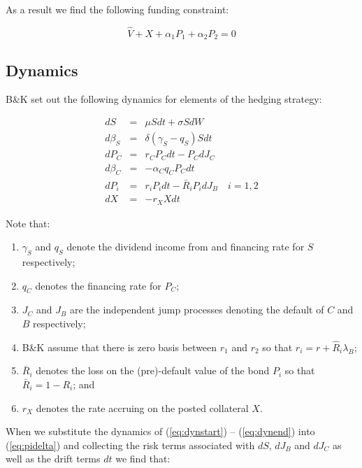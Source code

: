 \documentclass{tufte-handout}
\begin{document}
As a result we find the following funding constraint:

\begin{equation}\label{eq:fundingconstraint}
  \hat{V} + X + \alpha_1 P_1 + \alpha_2 P_2 = 0
\end{equation}

\subsection{Dynamics}\label{sec:dynamics}

B\&K set out the following dynamics for elements of the hedging strategy:

\begin{eqnarray}
  dS       & = & \mu S dt + \sigma S dW \label{eq:dynstart}\\
  d\beta_S & = & \delta (\gamma_S - q_S) S dt \\
  dP_C     & = & r_C P_C dt - P_C dJ_C \\
  d\beta_C & = &  -\alpha_C q_C P_C dt \\
  dP_i     & = & r_i P_i dt - \bar{R}_i P_i dJ_B \quad i = 1, 2\\
  dX       & = & -r_X X dt \label{eq:dynend}
\end{eqnarray}

Note that:

\begin{enumerate}

\item $\gamma_S$ and $q_S$ denote the dividend income from and financing rate
for $S$ respectively;
\item $q_C$ denotes the financing rate for $P_C$;
\item $J_C$ and $J_B$ are the independent jump processes denoting the default
of $C$ and $B$ respectively;
\item B\&K assume that there is zero basis between $r_1$ and $r_2$ so that
$r_i = r + \hat{R}_i\lambda_B$;
\item $\bar{R}_i$ denotes the loss on the (pre)-default value of the bond $P_i$
so that $\bar{R}_i = 1 - R_i$; and
\item $r_X$ denotes the rate accruing on the posted collateral $X$.
\end{enumerate}

When we substitute the dynamics of (\ref{eq:dynstart}) -- (\ref{eq:dynend}) into
(\ref{eq:pidelta}) and collecting the risk terms associated with $dS$, $dJ_B$ and
$dJ_C$ as well as the drift terms $dt$ we find that:
\end{document}
